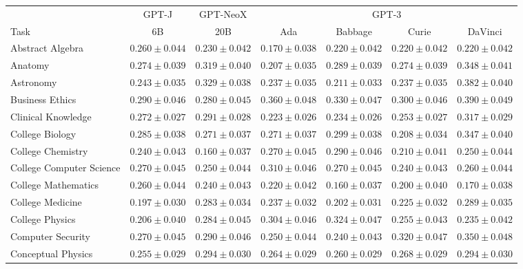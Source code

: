 \documentclass[11pt]{article}
\begin{document}
{\onecolumn
\begin{landscape}
\begin{table}    
\centering %
\begin{tabular}{l c c c c c c }
 & GPT-J & GPT-NeoX & \multicolumn{4}{c}{GPT-3} \\
Task & 6B & 20B & Ada & Babbage & Curie & DaVinci\\ \toprule
Abstract Algebra & $0.260 \pm 0.044$ & $0.230 \pm 0.042$ & $0.170 \pm 0.038$ & $0.220 \pm 0.042$ & $0.220 \pm 0.042$ & $0.220 \pm 0.042$ \\ 
Anatomy & $0.274 \pm 0.039$ & $0.319 \pm 0.040$ & $0.207 \pm 0.035$ & $0.289 \pm 0.039$ & $0.274 \pm 0.039$ & $0.348 \pm 0.041$ \\ 
Astronomy & $0.243 \pm 0.035$ & $0.329 \pm 0.038$ & $0.237 \pm 0.035$ & $0.211 \pm 0.033$ & $0.237 \pm 0.035$ & $0.382 \pm 0.040$ \\ 
Business Ethics & $0.290 \pm 0.046$ & $0.280 \pm 0.045$ & $0.360 \pm 0.048$ & $0.330 \pm 0.047$ & $0.300 \pm 0.046$ & $0.390 \pm 0.049$ \\ 
Clinical Knowledge & $0.272 \pm 0.027$ & $0.291 \pm 0.028$ & $0.223 \pm 0.026$ & $0.234 \pm 0.026$ & $0.253 \pm 0.027$ & $0.317 \pm 0.029$ \\ 
College Biology & $0.285 \pm 0.038$ & $0.271 \pm 0.037$ & $0.271 \pm 0.037$ & $0.299 \pm 0.038$ & $0.208 \pm 0.034$ & $0.347 \pm 0.040$ \\ 
College Chemistry & $0.240 \pm 0.043$ & $0.160 \pm 0.037$ & $0.270 \pm 0.045$ & $0.290 \pm 0.046$ & $0.210 \pm 0.041$ & $0.250 \pm 0.044$ \\ 
College Computer Science & $0.270 \pm 0.045$ & $0.250 \pm 0.044$ & $0.310 \pm 0.046$ & $0.270 \pm 0.045$ & $0.240 \pm 0.043$ & $0.260 \pm 0.044$ \\ 
College Mathematics & $0.260 \pm 0.044$ & $0.240 \pm 0.043$ & $0.220 \pm 0.042$ & $0.160 \pm 0.037$ & $0.200 \pm 0.040$ & $0.170 \pm 0.038$ \\ 
College Medicine & $0.197 \pm 0.030$ & $0.283 \pm 0.034$ & $0.237 \pm 0.032$ & $0.202 \pm 0.031$ & $0.225 \pm 0.032$ & $0.289 \pm 0.035$ \\ 
College Physics & $0.206 \pm 0.040$ & $0.284 \pm 0.045$ & $0.304 \pm 0.046$ & $0.324 \pm 0.047$ & $0.255 \pm 0.043$ & $0.235 \pm 0.042$ \\ 
Computer Security & $0.270 \pm 0.045$ & $0.290 \pm 0.046$ & $0.250 \pm 0.044$ & $0.240 \pm 0.043$ & $0.320 \pm 0.047$ & $0.350 \pm 0.048$ \\ 
Conceptual Physics & $0.255 \pm 0.029$ & $0.294 \pm 0.030$ & $0.264 \pm 0.029$ & $0.260 \pm 0.029$ & $0.268 \pm 0.029$ & $0.294 \pm 0.030$ \\ 

\end{tabular}
\end{table}
\end{landscape}}
\end{document}
